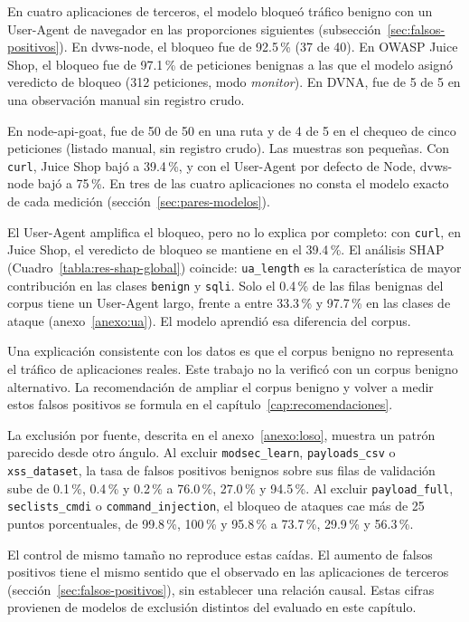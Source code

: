 En cuatro aplicaciones de terceros, el modelo bloqueó tráfico benigno con un User-Agent de navegador en las proporciones siguientes (subsección~\ref{sec:falsos-positivos}). En dvws-node, el bloqueo fue de 92.5\,\% (37 de 40). En OWASP Juice Shop, el bloqueo fue de 97.1\,\% de peticiones benignas a las que el modelo asignó veredicto de bloqueo (312 peticiones, modo \textit{monitor}). En DVNA, fue de 5 de 5 en una observación manual sin registro crudo.

En node-api-goat, fue de 50 de 50 en una ruta y de 4 de 5 en el chequeo de cinco peticiones (listado manual, sin registro crudo). Las muestras son pequeñas. Con \texttt{curl}, Juice Shop bajó a 39.4\,\%, y con el User-Agent por defecto de Node, dvws-node bajó a 75\,\%. En tres de las cuatro aplicaciones no consta el modelo exacto de cada medición (sección~\ref{sec:pares-modelos}).

El User-Agent amplifica el bloqueo, pero no lo explica por completo: con \texttt{curl}, en Juice Shop, el veredicto de bloqueo se mantiene en el 39.4\,\%. El análisis SHAP (Cuadro~\ref{tabla:res-shap-global}) coincide: \texttt{ua\_length} es la característica de mayor contribución en las clases \texttt{benign} y \texttt{sqli}. Solo el 0.4\,\% de las filas benignas del corpus tiene un User-Agent largo, frente a entre 33.3\,\% y 97.7\,\% en las clases de ataque (anexo~\ref{anexo:ua}). El modelo aprendió esa diferencia del corpus.

Una explicación consistente con los datos es que el corpus benigno no representa el tráfico de aplicaciones reales. Este trabajo no la verificó con un corpus benigno alternativo. La recomendación de ampliar el corpus benigno y volver a medir estos falsos positivos se formula en el capítulo~\ref{cap:recomendaciones}.

La exclusión por fuente, descrita en el anexo~\ref{anexo:loso}, muestra un patrón parecido desde otro ángulo. Al excluir \texttt{modsec\_learn}, \texttt{payloads\_csv} o \texttt{xss\_dataset}, la tasa de falsos positivos benignos sobre sus filas de validación sube de 0.1\,\%, 0.4\,\% y 0.2\,\% a 76.0\,\%, 27.0\,\% y 94.5\,\%. Al excluir \texttt{payload\_full}, \texttt{seclists\_cmdi} o \texttt{command\_injection}, el bloqueo de ataques cae más de 25 puntos porcentuales, de 99.8\,\%, 100\,\% y 95.8\,\% a 73.7\,\%, 29.9\,\% y 56.3\,\%.

El control de mismo tamaño no reproduce estas caídas. El aumento de falsos positivos tiene el mismo sentido que el observado en las aplicaciones de terceros (sección~\ref{sec:falsos-positivos}), sin establecer una relación causal. Estas cifras provienen de modelos de exclusión distintos del evaluado en este capítulo.

